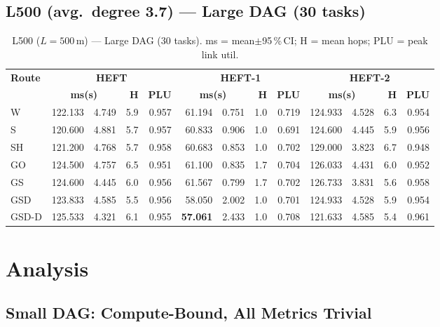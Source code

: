 \documentclass[11pt]{article}
\newcommand{\win}[1]{\textcolor{green!50!black}{\textbf{#1}}}
\newcommand{\bad}[1]{\textcolor{red!70!black}{#1}}
\begin{document}
\subsection{L500 (avg.\ degree 3.7) --- Large DAG (30 tasks)}
\begin{table}[H]\centering\small
\begin{tabular}{l r@{$\pm$}l r r r@{$\pm$}l r r r@{$\pm$}l r r}
\toprule
\textbf{Route} & \multicolumn{4}{c}{\textbf{HEFT}} & \multicolumn{4}{c}{\textbf{HEFT-1}} & \multicolumn{4}{c}{\textbf{HEFT-2}} \\
\cmidrule(lr){2-5}\cmidrule(lr){6-9}\cmidrule(lr){10-13}
& \multicolumn{2}{c}{\textbf{ms(s)}} & \textbf{H} & \textbf{PLU}& \multicolumn{2}{c}{\textbf{ms(s)}} & \textbf{H} & \textbf{PLU}& \multicolumn{2}{c}{\textbf{ms(s)}} & \textbf{H} & \textbf{PLU} \\
\midrule
  W & 122.133 & 4.749 & 5.9 & 0.957 & 61.194 & 0.751 & 1.0 & 0.719 & 124.933 & 4.528 & 6.3 & 0.954 \\
  S & 120.600 & 4.881 & 5.7 & 0.957 & 60.833 & 0.906 & 1.0 & 0.691 & 124.600 & 4.445 & 5.9 & 0.956 \\
  SH & 121.200 & 4.768 & 5.7 & 0.958 & 60.683 & 0.853 & 1.0 & 0.702 & \bad{129.000} & 3.823 & 6.7 & 0.948 \\
  GO & 124.500 & 4.757 & 6.5 & 0.951 & 61.100 & 0.835 & 1.7 & 0.704 & 126.033 & 4.431 & 6.0 & 0.952 \\
  GS & 124.600 & 4.445 & 6.0 & 0.956 & \bad{61.567} & 0.799 & 1.7 & 0.702 & 126.733 & 3.831 & 5.6 & 0.958 \\
  GSD & 123.833 & 4.585 & 5.5 & 0.956 & 58.050 & 2.002 & 1.0 & 0.701 & 124.933 & 4.528 & 5.9 & 0.954 \\
  GSD-D & \bad{125.533} & 4.321 & 6.1 & 0.955 & \win{57.061} & 2.433 & 1.0 & 0.708 & 121.633 & 4.585 & 5.4 & 0.961 \\
\bottomrule\end{tabular}
\caption{L500 ($L=500$\,m) --- Large DAG (30 tasks). ms = mean$\pm$95\,\%\,CI; H = mean hops; PLU = peak link util.}
\end{table}

\section{Analysis}

\subsection{Small DAG: Compute-Bound, All Metrics Trivial}
\end{document}
